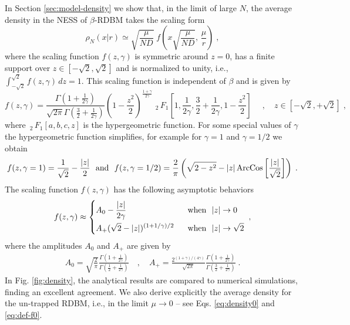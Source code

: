 \documentclass[onecolumn,superscriptaddress,
 amsmath,amssymb,
 aps,
 prd,
]{revtex4-1}
\newcommand{\bea}{\begin{eqnarray}}
\newcommand{\eea}{\end{eqnarray}}
\begin{document}
{\vspace*{0.3cm}
In Section \ref{sec:model-density} we show that, in the limit of large $N$, the average density in the NESS of $\beta$-RDBM takes the scaling form
\begin{equation}\label{eq:main-density}
\rho_N(x | r) \simeq \sqrt{\frac{\mu}{N D}} \; f\left( x \sqrt{\frac{\mu}{N D}} , \, \frac{\mu}{r} \right) \;,
\end{equation}
where the scaling function $f(z, \gamma)$ is symmetric around $z=0$, has a finite support over $z \in [-\sqrt{2}, \sqrt{2}]$ and is normalized to unity, i.e., $\int_{-\sqrt{2}}^{\sqrt{2}}f(z,\gamma)\, dz = 1$.  This scaling function is independent of $\beta$ and is given by
\begin{equation} \label{eq:main-f}
f(z, \gamma) = \frac{\Gamma\left( 1 + \frac{1}{2 \gamma} \right)}{\sqrt{2 \pi} \Gamma\left( \frac{3}{2}+\frac{1}{2 \gamma}\right)} \left( 1 - \frac{z^2}{2} \right)^{\frac{1 + \gamma}{2 \gamma}}\, \,_2\,{F}_1 \left[1, \frac{1}{2\gamma}, \frac{3}{2} + \frac{1}{2\gamma}, 1 -\frac{z^2}{2} \right] \; \quad, \quad z \in [-\sqrt{2},+\sqrt{2}] \;,
\end{equation}
where $\,_2\,{F}_1[a, b, c, z]$ is the hypergeometric function. For some special values of $\gamma$ the hypergeometric function simplifies, for example for $\gamma = 1$ and $\gamma = 1/2$ we obtain
\begin{equation} \label{eq:main-density-special}
f(z, \gamma = 1) = \frac{1}{\sqrt{2}} - \frac{|z|}{2} \mbox{~~and~~} f(z, \gamma = 1/2) = \frac{2}{\pi} \left( \sqrt{2 - z^2} - |z| \, {\rm ArcCos} \left[ \frac{|z|}{\sqrt{2}} \right] \right) \;.
\end{equation}
The scaling function $f(z, \gamma)$ has the following asymptotic behaviors
\begin{equation} \label{eq:main-f-asymp}
f(z, \gamma) \approx \begin{dcases}
A_0 - \frac{|z|}{2 \gamma} &\mbox{~~when~~} |z| \to 0 \\
A_{+} (\sqrt{2} - |z|)^{(1 + 1/\gamma)/2} &\mbox{~~when~~} |z| \to \sqrt{2}
\end{dcases}\;,
\end{equation}
where the amplitudes $A_0$ and $A_+$ are given by
\bea \label{A0Ap}
A_0 = \sqrt{\frac{2}{\pi}} \frac{\Gamma\left(1+\frac{1}{2\gamma}\right)}{\Gamma \left(\frac{1}{2}+\frac{1}{2 \gamma}\right)}  \quad, \quad A_+ = \frac{2^{(1+\gamma)/(4 \gamma)}}{\sqrt{2\pi}} \frac{\Gamma\left( 1 + \frac{1}{2 \gamma}\right)}{\Gamma\left(\frac{3}{2} + \frac{1}{2 \gamma} \right)} \;.
\eea
In Fig. \ref{fig:density}, the analytical results are compared to numerical simulations, finding an excellent agreement. We also derive explicitly the average density for the un-trapped RDBM, i.e., in the limit $\mu \to 0$ -- see Eqs. \eqref{eq:density0} and \eqref{eq:def-f0}.



}
\end{document}
